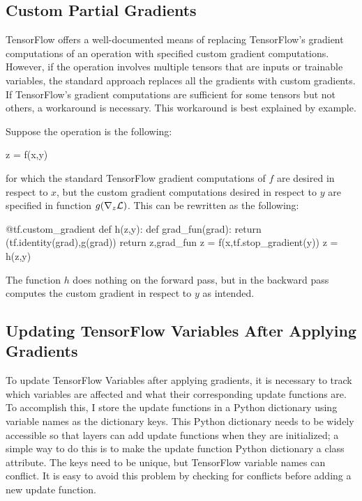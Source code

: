 \subsection{Custom Partial Gradients}
TensorFlow offers a well-documented means of replacing TensorFlow's gradient computations of an operation with specified custom gradient computations. However, if the operation involves multiple tensors that are inputs or trainable variables, the standard approach replaces all the gradients with custom gradients. If TensorFlow's gradient computations are sufficient for some tensors but not others, a workaround is necessary. This workaround is best explained by example.

Suppose the operation is the following:


\begin{code}
z = f(x,y)
\end{code}

for which the standard TensorFlow gradient computations of $f$ are desired in respect to $x$, but the custom gradient computations desired in respect to $y$ are specified in function $g(\nabla_z \mathcal{L})$. This can be rewritten as the following:

\begin{code}
@tf.custom_gradient
def h(z,y):
    def grad_fun(grad):
        return (tf.identity(grad),g(grad))
    return z,grad_fun
z = f(x,tf.stop_gradient(y))
z = h(z,y)
\end{code}

The function $h$ does nothing on the forward pass, but in the backward pass computes the custom gradient in respect to $y$ as intended.

\subsection{Updating TensorFlow Variables After Applying Gradients}
To update TensorFlow Variables after applying gradients, it is necessary to track which variables are affected and what their corresponding update functions are. To accomplish this, I store the update functions in a Python dictionary using variable names as the dictionary keys. This Python dictionary needs to be widely accessible so that layers can add update functions when they are initialized; a simple way to do this is to make the update function Python dictionary a class attribute. The keys need to be unique, but TensorFlow variable names can conflict. It is easy to avoid this problem by checking for conflicts before adding a new update function.

